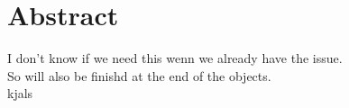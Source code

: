 \chapter{Abstract}
\label{ch:abstract}
I don't know if we need this wenn we already have the issue.\\
So will also be finishd at the end of the objects.\\



kjals